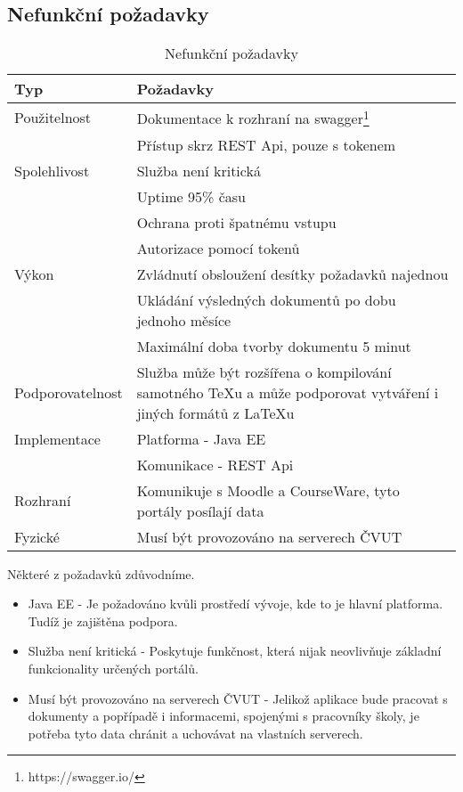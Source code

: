  \subsection{Nefunkční požadavky}
 
 \begin{table}[H]
 	\begin{center}
 		\begin{tabular}{ p{4cm} P{8,6cm} }
 			\textbf{Typ} & \textbf{Požadavky} \\
 			\midrule[0,15em]
 			Použitelnost & \tabitem Dokumentace k rozhraní na swagger\footnote{https://swagger.io/}\\
 						& \tabitem Přístup skrz REST Api, pouze s tokenem\\
 			\midrule		
 			Spolehlivost & \tabitem Služba není kritická\\
 						& \tabitem Uptime 95\% času\\
 						& \tabitem Ochrana proti špatnému vstupu\\
 						& \tabitem Autorizace pomocí tokenů\\
 			\midrule
 			Výkon & \tabitem Zvládnutí obsloužení desítky požadavků najednou\\
 						& \tabitem Ukládání výsledných dokumentů po dobu jednoho měsíce\\
 						& \tabitem Maximální doba tvorby dokumentu 5 minut\\	
			\midrule
			Podporovatelnost & \tabitem Služba může být rozšířena o kompilování samotného TeXu a může podporovat vytváření i jiných formátů z \LaTeX u\\	
			\midrule
			Implementace & \tabitem Platforma - Java EE\\
						& \tabitem Komunikace - REST Api\\
			\midrule
 			Rozhraní & \tabitem Komunikuje s Moodle a CourseWare, tyto portály posílají data\\
 			\midrule
 			Fyzické & \tabitem Musí být provozováno na serverech ČVUT\\
 	\end{tabular}
 	\end{center}
 	\caption{Nefunkční požadavky}
 	\label{tab:errors}
 \end{table}
 
 Některé z požadavků zdůvodníme.
 \begin{itemize}
 	\item Java EE - Je požadováno kvůli prostředí vývoje, kde to je hlavní platforma. Tudíž je zajištěna podpora. 
 	\item Služba není kritická - Poskytuje funkčnost, která nijak neovlivňuje základní funkcionality určených portálů. 
 	\item Musí být provozováno na serverech ČVUT - Jelikož aplikace bude pracovat s dokumenty a popřípadě i informacemi, spojenými s pracovníky školy, je potřeba tyto data chránit a uchovávat na vlastních serverech.
 \end{itemize}
 

